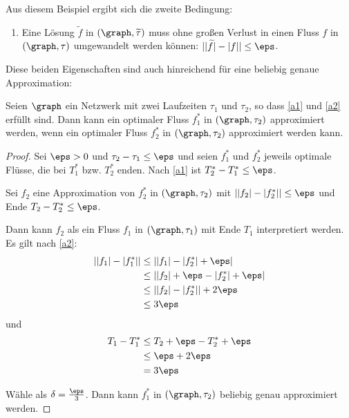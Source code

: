 Aus diesem Beispiel ergibt sich die zweite Bedingung:
\begin{framed}
\begin{enumerate}[start=2, label={(A\arabic*)}]
    \item Eine Lösung $\widetilde{f}$ in $(\graph, \widetilde{\tau})$ muss
        ohne großen Verlust in einen Fluss $f$ in $(\graph, \tau)$
        umgewandelt werden können: $||\widetilde{f}| - |f|| \leq \eps$.
        \label{a2}
\end{enumerate}
\end{framed}

Diese beiden Eigenschaften sind auch hinreichend für eine beliebig genaue
Approximation:
\begin{corollary}
    Seien $\graph$ ein Netzwerk mit zwei Laufzeiten $\tau_1$ und $\tau_2$, so dass
    \ref{a1} und \ref{a2} erfüllt sind.
    Dann kann ein optimaler Fluss $f_1^*$ in $(\graph, \tau_2)$ approximiert werden,
    wenn ein optimaler Fluss $f_2^*$ in $(\graph, \tau_2)$ approximiert werden kann.

    \begin{proof}    
        Sei $\eps > 0$ und $\tau_2 - \tau_1 \leq \eps$ und seien
        $f_1^*$ und $f_2^*$ jeweils optimale Flüsse, die bei
        $T_1^*$ bzw. $T_2^*$ enden. Nach \ref{a1} ist $T_2^* - T_1^*\leq \eps$.

        Sei $f_2$ eine Approximation von $f_2^*$ in $(\graph, \tau_2)$ mit
        $||f_2| - |f_2^*|| \leq \eps$ und Ende $T_2 - T_2^* \leq \eps$.

        Dann kann $f_2$ als ein Fluss $f_1$ in $(\graph, \tau_1)$
        mit Ende $T_1$ interpretiert werden. Es gilt nach \ref{a2}:
        \begin{align*}
            ||f_1| - |f_1^*|| & \leq ||f_1| - |f_2^*| + \eps| \\
                            & \leq ||f_2| + \eps - |f_2^*| + \eps| \\
                            & \leq ||f_2| - |f_2^*|| + 2 \eps \\
                            & \leq 3 \eps
        \end{align*}
        und
        \begin{align*}
            T_1 - T_1^*  & \leq T_2 + \eps - T_2^* + \eps \\
                & \leq \eps + 2\eps \\
                & = 3 \eps
        \end{align*}
        
        Wähle als $\delta = \frac{\eps}{3}$. Dann kann $f_1^*$ in
        $(\graph, \tau_2)$ beliebig genau approximiert werden.
    \end{proof}
\end{corollary}



